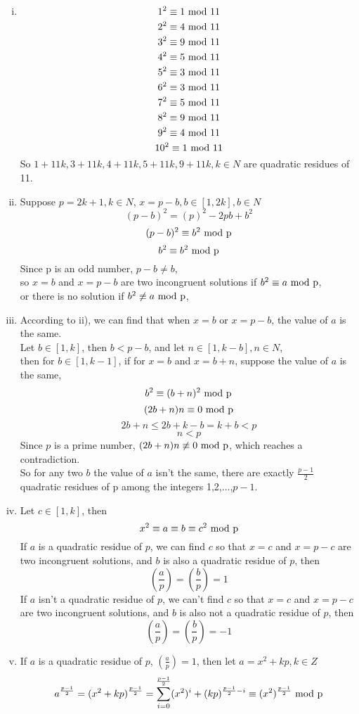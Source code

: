 \documentclass{article}
\begin{document}
\section{}
\begin{enumerate}[i)]
\item
$$1^2\equiv1\ \rm{mod}\ 11$$
$$2^2\equiv4\ \rm{mod}\ 11$$
$$3^2\equiv9\ \rm{mod}\ 11$$
$$4^2\equiv5\ \rm{mod}\ 11$$
$$5^2\equiv3\ \rm{mod}\ 11$$
$$6^2\equiv3\ \rm{mod}\ 11$$
$$7^2\equiv5\ \rm{mod}\ 11$$
$$8^2\equiv9\ \rm{mod}\ 11$$
$$9^2\equiv4\ \rm{mod}\ 11$$
$$10^2\equiv1\ \rm{mod}\ 11$$
So $1+11k,3+11k,4+11k,5+11k,9+11k,k\in N$ are quadratic residues of 11.
\item
Suppose $p=2k+1,k\in N$, $x=p-b,b\in[1,2k],b\in N$
$$(p-b)^2=(p)^2-2pb+b^2$$
$$(p-b)^2\equiv b^2\ \rm{mod}\ p$$
$$b^2\equiv b^2\ \rm{mod}\ p$$
Since p is an odd number, $p-b\neq b$,\\
so $x=b$ and $x=p-b$ are two incongruent solutions if $b^2\equiv a\ \rm{mod}\ p$,\\
or there is no solution if $b^2\not\equiv a\ \rm{mod}\ p$,
\item
According to ii), we can find that when $x=b$ or $x=p-b$, the value of $a$ is the same.\\
Let $b\in[1,k]$, then $b<p-b$, and let $n\in[1,k-b],n\in N$,\\
then for $b\in[1,k-1]$, if for $x=b$ and $x=b+n$, suppose the value of $a$ is the same,
$$b^2\equiv(b+n)^2\ \rm{mod}\ p$$
$$(2b+n)n\equiv0\ \rm{mod}\ p$$
$$2b+n\leqslant2b+k-b=k+b<p$$
$$n<p$$
Since $p$ is a prime number, $(2b+n)n\not\equiv0\ \rm{mod}\ p$, which reaches a contradiction.\\
So for any two $b$ the value of $a$ isn't the same, there are exactly $\frac{p-1}{2}$ quadratic residues of p among the integers 1,2,...,$p-1$.
\item
Let $c\in[1,k]$, then 
$$x^2\equiv a\equiv b\equiv c^2\ \rm{mod}\ p$$
If $a$ is a quadratic residue of $p$, we can find $c$ so that $x=c$ and $x=p-c$ are two incongruent solutions, and $b$ is also a quadratic residue of $p$, then
$$\left(\frac{a}{p}\right)=\left(\frac{b}{p}\right)=1$$
If $a$ isn't a quadratic residue of $p$, we can't find $c$ so that $x=c$ and $x=p-c$ are two incongruent solutions, and $b$ is also not a quadratic residue of $p$, then
$$\left(\frac{a}{p}\right)=\left(\frac{b}{p}\right)=-1$$
\item
If $a$ is a quadratic residue of $p$, $(\frac{a}{p})=1$, then let $a=x^2+kp,k\in Z$
$$a^{\frac{p-1}{2}}=(x^2+kp)^{\frac{p-1}{2}}=\sum_{i=0}^{\frac{p-1}{2}}(x^2)^i+(kp)^{\frac{p-1}{2}-i}\equiv(x^2)^{\frac{p-1}{2}}\ \rm{mod}\ p$$

\end{enumerate}
\end{document}
